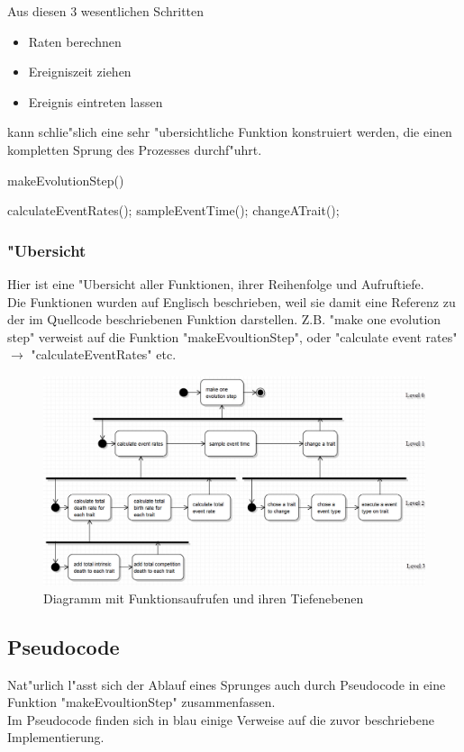 \documentclass[11pt, a4paper, german]{article}
\theoremstyle{plain}
\begin{document}
	Aus diesen 3 wesentlichen Schritten
	\begin{itemize}
		\item Raten berechnen
		\item Ereigniszeit ziehen
		\item Ereignis eintreten lassen
	\end{itemize}
	kann schlie"slich eine sehr "ubersichtliche Funktion konstruiert werden, die einen kompletten Sprung des Prozesses durchf"uhrt.
	\begin{algorithm}[H]
 		\caption{makeEvolutionStep()}
 		\begin{algorithmic}[1]
 			\State calculateEventRates();
 			\State sampleEventTime();
 			\State changeATrait();
 		\end{algorithmic}
 	\end{algorithm}
	 	
	\subsubsection{"Ubersicht}
	Hier ist eine "Ubersicht aller Funktionen, ihrer Reihenfolge und Aufruftiefe. \\
	Die Funktionen wurden auf Englisch beschrieben, weil sie damit eine Referenz zu der im Quellcode beschriebenen Funktion darstellen. Z.B. "{}make one evolution step"{} verweist auf die Funktion "{}makeEvoultionStep"{}, oder "{}calculate event rates"{} $ \to $ "{}calculateEventRates"{} etc.
	\begin{figure}[H]
		\centering
		\includegraphics[width=1\linewidth]{../UMLs/PseudoCodeForBThesis}
		\caption{Diagramm mit Funktionsaufrufen und ihren Tiefenebenen}
		\label{fig:PseudoCodeForBThesis}
	\end{figure}
	
	\subsection{Pseudocode}
	Nat"urlich l"asst sich der Ablauf eines Sprunges auch durch Pseudocode in eine Funktion "{}makeEvoultionStep"{} zusammenfassen.\\
	Im Pseudocode finden sich in blau einige Verweise auf die zuvor beschriebene Implementierung.
	
\end{document}
